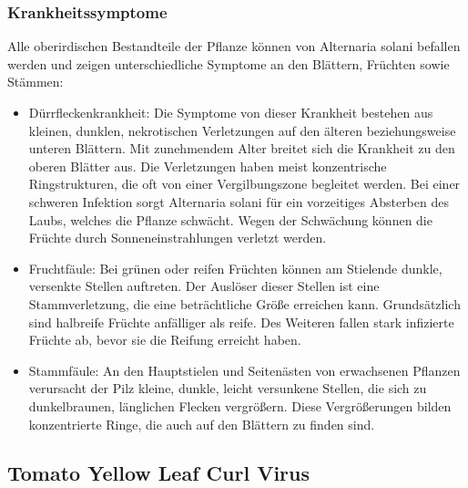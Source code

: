 \subsubsection{Krankheitssymptome}


Alle oberirdischen Bestandteile der Pflanze können von Alternaria solani befallen werden und zeigen unterschiedliche Symptome an den Blättern, Früchten sowie Stämmen\cite{borner,solani}:

\begin{itemize}
	\item Dürrfleckenkrankheit: Die Symptome von dieser Krankheit bestehen aus kleinen, dunklen, nekrotischen Verletzungen auf den älteren beziehungsweise unteren Blättern. Mit zunehmendem Alter breitet sich die Krankheit zu den oberen Blätter aus. Die Verletzungen haben meist konzentrische Ringstrukturen, die oft von einer Vergilbungszone begleitet werden. Bei einer schweren Infektion sorgt Alternaria solani für ein vorzeitiges Absterben des Laubs, welches die Pflanze schwächt. Wegen der Schwächung können die Früchte durch Sonneneinstrahlungen verletzt werden. 
	 
	\item Fruchtfäule: Bei grünen oder reifen Früchten können am Stielende dunkle, versenkte Stellen auftreten. Der Auslöser dieser Stellen ist eine Stammverletzung, die eine beträchtliche Größe erreichen kann. Grundsätzlich sind halbreife Früchte anfälliger als reife. Des Weiteren fallen stark infizierte Früchte ab, bevor sie die Reifung erreicht haben. 
	
	\item Stammfäule: An den Hauptstielen und Seitenästen von erwachsenen Pflanzen verursacht der Pilz kleine, dunkle, leicht versunkene Stellen, die sich zu dunkelbraunen, länglichen Flecken vergrößern. Diese Vergrößerungen bilden konzentrierte Ringe, die auch auf den Blättern zu finden sind.
	
\end{itemize}




\subsection{Tomato Yellow Leaf Curl Virus}


